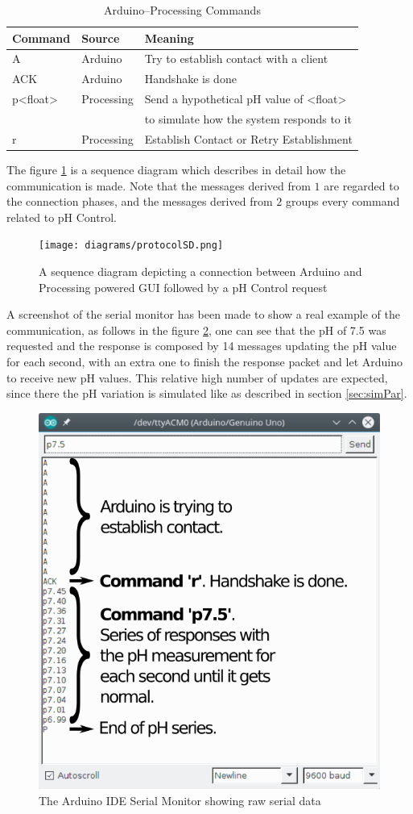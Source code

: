 \begin{table}[h]
\centering
\caption{Arduino--Processing Commands}
\label{tab:commands}
\begin{tabular}[h]{|l|l|l|}
    \hline
    \textbf{Command}     & \textbf{Source}    & \textbf{Meaning}
    \\\hline
    A           & Arduino    & Try to establish contact with a client
    \\\hline
    ACK         & Arduino    & Handshake is done
    \\\hline
    p<float>    & Processing & Send a hypothetical pH value of <float> \\ 
                &            & to simulate how the system responds to it
    \\\hline
    r           & Processing & Establish Contact or Retry Establishment
    \\\hline
\end{tabular}
\end{table}

The figure \ref{fig:sdProtocol} is a sequence diagram which describes in detail how the communication is made.
Note that the messages derived from $1$ are regarded to the connection phases,
and the messages derived from $2$ groups every command related to pH Control.

\begin{figure}[h]
    \centering
    \texttt{[image: diagrams/protocolSD.png]}
    \caption{A sequence diagram depicting a connection between Arduino and Processing powered GUI followed by a pH Control request}
    \label{fig:sdProtocol}
\end{figure}

A screenshot of the serial monitor has been made to show a real example of the communication,
as follows in the figure \ref{fig:serialMonitor},
one can see that the pH of 7.5 was requested and the response is composed by 14 messages updating the pH value for each second,
with an extra one to finish the response packet and let Arduino to receive new pH values.
This relative high number of updates are expected,
since there the pH variation is simulated like as described in section \ref{sec:simPar}.

\begin{figure}[h]
    \centering
    \includegraphics[width=.4\textwidth]{img/serialMon.png}
    \caption{The Arduino IDE Serial Monitor showing raw serial data}
    \label{fig:serialMonitor}
\end{figure}

